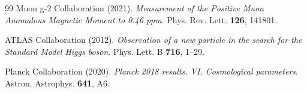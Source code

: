 \begin{thebibliography}{99}
		Muon g-2 Collaboration (2021). \textit{Measurement of the Positive Muon Anomalous Magnetic Moment to 0.46 ppm}. Phys. Rev. Lett. \textbf{126}, 141801.
		
		ATLAS Collaboration (2012). \textit{Observation of a new particle in the search for the Standard Model Higgs boson}. Phys. Lett. B \textbf{716}, 1--29.
		
		Planck Collaboration (2020). \textit{Planck 2018 results. VI. Cosmological parameters}. Astron. Astrophys. \textbf{641}, A6.
	\end{thebibliography}
	